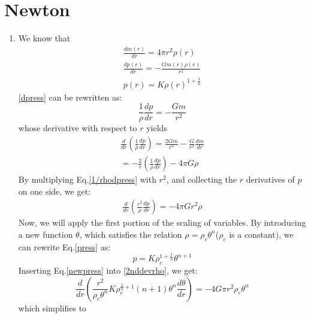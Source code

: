 \documentclass[aps,twocolumn,showpacs,preprintnumbers,nofootinbib,prl,superscriptaddress,groupedaddress]{revtex4-2}
\begin{document}
\section{Newton}
\begin{enumerate}[label=(\alph*)]
    \item We know that \\
    \begin{align}
        \frac{dm(r)}{dr} = 4\pi r^{2}\rho(r)\label{dmass}    \\
        \frac{dp(r)}{dr} = -\frac{Gm(r)\rho(r)}{r^{2}}\label{dpress}  \\
        p(r) = K{\rho(r)}^{1+\frac{1}{n}}\label{press} 
    \end{align}
    \eqref{dpress} can be rewritten as:
    \begin{equation}
      \frac{1}{\rho}\frac{dp}{dr} = -\frac{Gm}{r^{2}}
    \end{equation}
    whose derivative with respect to $r$ yields
    \begin{align}
        \frac{d}{dr}\left(\frac{1}{\rho}\frac{dp}{dr}\right) = \frac{2Gm}{r^{3}} - \frac{G}{r^{2}}\frac{dm}{dr}    \nonumber \\
        =-\frac{2}{r}\left(\frac{1}{\rho}\frac{dp}{dr}\right) - 4\pi G\rho \label{1/rhodpress}
    \end{align}
    By multiplying Eq.\eqref{1/rhodpress} with $r^{2}$, and collecting the $r$ derivatives of $p$ on one side, we get:
    \begin{align}
        \frac{d}{dr}\left(\frac{r^{2}}{\rho}\frac{dp}{dr}\right) = -4\pi Gr^{2}\rho \label{2nddevrho}
    \end{align}
    Now, we will apply the first portion of the scaling of variables. By introducing a new function $\theta$, which satisfies the relation $\rho = \rho_{c}\theta^{n}$($\rho_{c}$ is a constant), we can rewrite Eq.\eqref{press} as:
    \begin{equation}
        p = K  \rho_{c}^{1+\frac{1}{n}}\theta^{n+1} \label{newpress}
    \end{equation}
    Inserting Eq.\eqref{newpress} into \eqref{2nddevrho}, we get:
    \begin{equation}
        \frac{d}{dr}\left(\frac{r^{2}}{\rho_{c}\theta^{n}}K\rho_{c}^{\frac{1}{n} + 1}(n+1)\theta^{n} \frac{d\theta}{dr}\right) = -4G\pi r^{2}\rho_{c}\theta^{n}
    \end{equation}
    which simplifies to
    \begin{equation}

\end{equation}
\end{enumerate}
\end{document}
